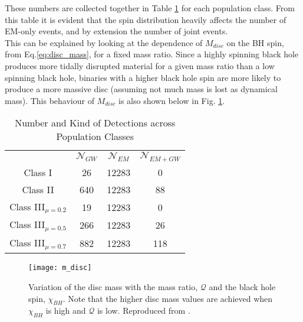    These numbers are collected together in Table \ref{tab:popln_numbers} for each
    population class. From this table it is evident that the spin distribution heavily
    affects the number of EM-only events, and by extension the number of joint events.\\
    This can be explained by looking at the dependence of $M_{disc}$ on the BH
    spin, from Eq.\ref{eq:disc_mass}, for a fixed mass ratio. Since a highly spinning
    black hole produces more tidally disrupted material for a given mass ratio than a
    low spinning black hole, binaries with a higher black hole spin are more likely to
    produce a more massive disc (assuming not much mass is lost as dynamical mass).
    This behaviour of $M_{disc}$ is also shown below in Fig. \ref{fig:m_disc}.

    \begin{table}[H]
        \centering
        \caption{Number and Kind of Detections across Population Classes}
        \begin{tabular}{cccc}
            \toprule

                &
            $\mathcal{N}_{GW}$ &
            $\mathcal{N}_{EM}$ &
            $\mathcal{N}_{EM+GW}$ \\

            Class I & 26 & 12283 & 0 \\

            Class II & 640 & 12283 & 88 \\

            Class III$_{\mu = 0.2}$ &
            19 & 12283 & 0 \\
            Class III$_{\mu = 0.5}$ &
            266 & 12283 & 26 \\
            Class III$_{\mu = 0.7}$ &
            882 & 12283 & 118 \\
            \bottomrule
        \end{tabular}
        \label{tab:popln_numbers}
    \end{table}


    \begin{figure}[H]
        \centering
        \texttt{[image: m\_disc]}
        \caption[Variation of $M_{\mathrm{disc}}$ with $\chi_{BH}$ and $\mathcal{Q}$]{
            Variation of the disc mass with the mass ratio, $\mathcal{Q}$ and the black
            hole spin, $\chi_{BH}$. Note that the higher disc mass values are achieved
            when $\chi_{BH}$ is high and $\mathcal{Q}$ is low. Reproduced from
            \cite{barbieri_2019b}.
        }
        \label{fig:m_disc}
    \end{figure}

